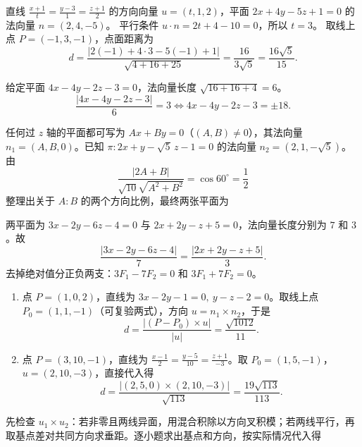 直线 $\frac{x+1}{t}=\frac{y-3}{1}=\frac{z+1}{2}$ 的方向向量 $u=(t,1,2)$，平面 $2x+4y-5z+1=0$ 的法向量 $n=(2,4,-5)$。
平行条件 $u\cdot n=2t+4-10=0$，所以 $t=3$。
取线上点 $P=(-1,3,-1)$，点面距离为
\[d=\frac{|2(-1)+4\cdot3-5(-1)+1|}{\sqrt{4+16+25}}=\frac{16}{3\sqrt5}=\frac{16\sqrt5}{15}.\]

给定平面 $4x-4y-2z-3=0$，法向量长度 $\sqrt{16+16+4}=6$。
\[\frac{|4x-4y-2z-3|}{6}=3 \iff 4x-4y-2z-3=\pm18.\]

任何过 $z$ 轴的平面都可写为 $Ax+By=0$（$(A,B)\ne0$），其法向量 $n_1=(A,B,0)$。已知 $\pi:2x+y-\sqrt5\,z-1=0$ 的法向量 $n_2=(2,1,-\sqrt5)$。
由
\[\frac{|2A+B|}{\sqrt{10}\sqrt{A^2+B^2}}=\cos60^\circ=\frac12\]
整理出关于 $A:B$ 的两个方向比例，最终两张平面为

两平面为 $3x-2y-6z-4=0$ 与 $2x+2y-z+5=0$，法向量长度分别为 $7$ 和 $3$。故
\[\frac{|3x-2y-6z-4|}{7}=\frac{|2x+2y-z+5|}{3}.\]
去掉绝对值分正负两支：$3F_1-7F_2=0$ 和 $3F_1+7F_2=0$。

\begin{enumerate}[label=(\arabic*)]
\item 点 $P=(1,0,2)$，直线为 $3x-2y-1=0,\ y-z-2=0$。取线上点 $P_0=(1,1,-1)$（可复验两式），方向 $u=n_1\times n_2$，于是
\[d=\frac{|(P-P_0)\times u|}{|u|}=\frac{\sqrt{1012}}{11}.\]
\item 点 $P=(3,10,-1)$，直线为 $\frac{x-1}{2}=\frac{y-5}{10}=\frac{z+1}{-3}$。取 $P_0=(1,5,-1)$，$u=(2,10,-3)$，直接代入得
\[d=\frac{|(2,5,0)\times(2,10,-3)|}{\sqrt{113}}=\frac{19\sqrt{113}}{113}.\]
\end{enumerate}

先检查 $u_1\times u_2$：若非零且两线异面，用混合积除以方向叉积模；若两线平行，再取基点差对共同方向求垂距。逐小题求出基点和方向，按实际情况代入得

